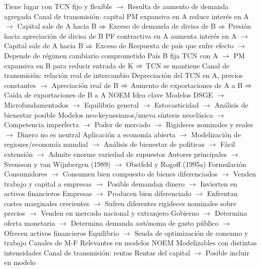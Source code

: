 \documentclass{nuevotema}
\begin{document}
\begin{esquemal}
				\4[] Tiene lugar con TCN fijo y flexible
				\4[] $\to$ Resulta de aumento de demanda agregada
				\4 Canal de transmisión: capital
				\4[] PM expansiva en A reduce interés en A
				\4[] $\to$ Capital sale de A hacia B
				\4[] $\Rightarrow$ Exceso de demanda de divisa de B
				\4[] $\Rightarrow$ Presión hacia apreciación de divisa de B
				\4[] PF contractiva en A aumenta interés en A
				\4[] $\to$ Capital sale de A hacia B
				\4[] $\Rightarrow$ Exceso de
				\4[] Respuesta de país que sufre efecto
				\4[] $\to$ Depende de régimen cambiario comprometido
				\4[] País B fija TCN con A
				\4[] $\to$ PM expansiva en B para reducir entrada de K
				\4[] $\Rightarrow$ TCN se mantiene
				\4 Canal de transmisión: relación real de intercambio
				\4[] Depreciación del TCN en A, precios constantes
				\4[] $\to$ Apreciación real de B
				\4[] $\Rightarrow$ Aumento de exportaciones de A a B
				\4[] $\Rightarrow$ Caída de exportaciones de B a A
			\3 NOEM
				\4 Idea clave
				\4[] Modelos DSGE
				\4[] $\to$ Microfundamentados
				\4[] $\to$ Equilibrio general
				\4[] $\to$ Estocasticidad
				\4[] $\to$ Análisis de bienestar posible
				\4[] Modelos neo-keynesianos/nueva síntesis neoclásica
				\4[] $\to$ Competencia imperfecta
				\4[] $\to$ Poder de mercado
				\4[] $\to$ Rigideces nominales y reales
				\4[] $\to$ Dinero no es neutral
				\4[] Aplicación a economía abierta
				\4[] $\to$ Modelización de regiones/economía mundial
				\4[] $\to$ Análisis de bienestar de políticas
				\4[] $\to$ Fácil extensión
				\4[] $\to$ Admite enorme variedad de supuestos
				\4[] Autores principales
				\4[] $\to$ Svensson y van Wijnbergen (1989)
				\4[] $\to$ Obstfeld y Rogoff (1995a)
				\4 Formulación
				\4[] Consumidores
				\4[] $\to$ Consumen bien compuesto de bienes diferenciados
				\4[] $\to$ Venden trabajo y capital a empresas
				\4[] $\to$ Posible demandan dinero
				\4[] $\to$ Invierten en activos financieros
				\4[] Empresas
				\4[] $\to$ Producen bien diferenciado
				\4[] $\to$ Enfrentan costes marginales crecientes
				\4[] $\to$ Sufren diferentes rigideces nominales sobre precios
				\4[] $\to$ Venden en mercado nacional y extranjero
				\4[] Gobierno
				\4[] $\to$ Determina oferta monetaria
				\4[] $\to$ Determina demanda autónoma de gasto público
				\4[] $\to$ Ofrecen activos financieros
				\4[] Equilibrio
				\4[] $\to$ Senda de optimización de consumo y trabajo
				\4 Canales de M-F
				\4[] Relevantes en modelos NOEM
				\4[] Modelizables con distintas intensidades
				\4 Canal de transmisión: rentas
				\4[] Rentas del capital
				\4[] $\to$ Posible incluir en modelo

\end{esquemal}
\end{document}
